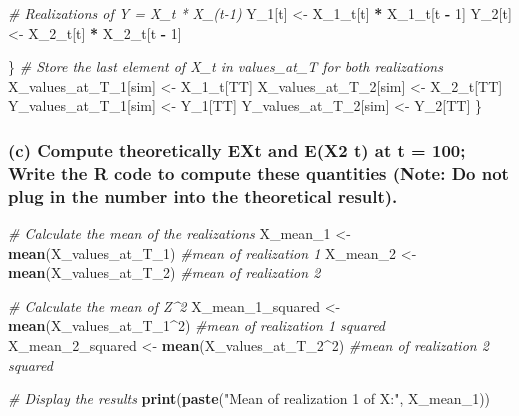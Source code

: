 \documentclass[
]{article}
\newenvironment{Shaded}{\begin{snugshade}}{\end{snugshade}}
\newcommand{\CommentTok}[1]{\textcolor[rgb]{0.56,0.35,0.01}{\textit{#1}}}
\newcommand{\DecValTok}[1]{\textcolor[rgb]{0.00,0.00,0.81}{#1}}
\newcommand{\FunctionTok}[1]{\textcolor[rgb]{0.13,0.29,0.53}{\textbf{#1}}}
\newcommand{\NormalTok}[1]{#1}
\newcommand{\OtherTok}[1]{\textcolor[rgb]{0.56,0.35,0.01}{#1}}
\newcommand{\SpecialCharTok}[1]{\textcolor[rgb]{0.81,0.36,0.00}{\textbf{#1}}}
\newcommand{\StringTok}[1]{\textcolor[rgb]{0.31,0.60,0.02}{#1}}
\begin{document}
\begin{Shaded}
\begin{Highlighting}[]
    \CommentTok{\# Realizations of Y = X\_t * X\_(t{-}1)}
\NormalTok{    Y\_1[t] }\OtherTok{\textless{}{-}}\NormalTok{ X\_1\_t[t] }\SpecialCharTok{*}\NormalTok{ X\_1\_t[t }\SpecialCharTok{{-}} \DecValTok{1}\NormalTok{]}
\NormalTok{    Y\_2[t] }\OtherTok{\textless{}{-}}\NormalTok{ X\_2\_t[t] }\SpecialCharTok{*}\NormalTok{ X\_2\_t[t }\SpecialCharTok{{-}} \DecValTok{1}\NormalTok{]}
    
\NormalTok{  \}}
  \CommentTok{\# Store the last element of X\_t in values\_at\_T for both realizations}
\NormalTok{  X\_values\_at\_T\_1[sim] }\OtherTok{\textless{}{-}}\NormalTok{ X\_1\_t[TT]}
\NormalTok{  X\_values\_at\_T\_2[sim] }\OtherTok{\textless{}{-}}\NormalTok{ X\_2\_t[TT]}
\NormalTok{  Y\_values\_at\_T\_1[sim] }\OtherTok{\textless{}{-}}\NormalTok{ Y\_1[TT]}
\NormalTok{  Y\_values\_at\_T\_2[sim] }\OtherTok{\textless{}{-}}\NormalTok{ Y\_2[TT]}
\NormalTok{\}}
\end{Highlighting}
\end{Shaded}

\hypertarget{c-compute-theoretically-ext-and-ex2-t-at-t-100-write-the-r-code-to-compute-these-quantities-note-do-not-plug-in-the-number-into-the-theoretical-result.}{%
\subsubsection{(c) Compute theoretically EXt and E(X2 t) at t = 100;
Write the R code to compute these quantities (Note: Do not plug in the
number into the theoretical
result).}\label{c-compute-theoretically-ext-and-ex2-t-at-t-100-write-the-r-code-to-compute-these-quantities-note-do-not-plug-in-the-number-into-the-theoretical-result.}}

\begin{Shaded}
\begin{Highlighting}[]
\CommentTok{\# Calculate the mean of the realizations}
\NormalTok{X\_mean\_1 }\OtherTok{\textless{}{-}} \FunctionTok{mean}\NormalTok{(X\_values\_at\_T\_1) }\CommentTok{\#mean of realization 1}
\NormalTok{X\_mean\_2 }\OtherTok{\textless{}{-}} \FunctionTok{mean}\NormalTok{(X\_values\_at\_T\_2) }\CommentTok{\#mean of realization 2}

\CommentTok{\# Calculate the mean of Z\^{}2}
\NormalTok{X\_mean\_1\_squared }\OtherTok{\textless{}{-}} \FunctionTok{mean}\NormalTok{(X\_values\_at\_T\_1}\SpecialCharTok{\^{}}\DecValTok{2}\NormalTok{) }\CommentTok{\#mean of realization 1 squared}
\NormalTok{X\_mean\_2\_squared }\OtherTok{\textless{}{-}} \FunctionTok{mean}\NormalTok{(X\_values\_at\_T\_2}\SpecialCharTok{\^{}}\DecValTok{2}\NormalTok{) }\CommentTok{\#mean of realization 2 squared}

\CommentTok{\# Display the results}
\FunctionTok{print}\NormalTok{(}\FunctionTok{paste}\NormalTok{(}\StringTok{"Mean of realization 1 of X:"}\NormalTok{, X\_mean\_1))}
\end{Highlighting}
\end{Shaded}
\end{document}
